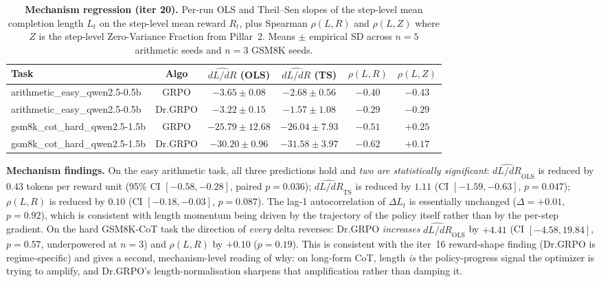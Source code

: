 \documentclass{article}
\begin{document}
\begin{table}[htbp]
\centering\small
\begin{tabular}{l c c c c c}
\hline
\textbf{Task} & \textbf{Algo} & \textbf{$\widehat{dL/dR}$ (OLS)} & \textbf{$\widehat{dL/dR}$ (TS)} & \textbf{$\rho(L,R)$} & \textbf{$\rho(L,Z)$} \\
\hline
arithmetic\_easy\_qwen2.5-0.5b & GRPO    & $-3.65 \pm 0.08$ & $-2.68 \pm 0.56$ & $-0.40$ & $-0.43$ \\
arithmetic\_easy\_qwen2.5-0.5b & Dr.GRPO & $-3.22 \pm 0.15$ & $-1.57 \pm 1.08$ & $-0.29$ & $-0.29$ \\
\hline
gsm8k\_cot\_hard\_qwen2.5-1.5b  & GRPO    & $-25.79 \pm 12.68$ & $-26.04 \pm 7.93$ & $-0.51$ & $+0.25$ \\
gsm8k\_cot\_hard\_qwen2.5-1.5b  & Dr.GRPO & $-30.20 \pm 0.96$  & $-31.58 \pm 3.97$ & $-0.62$ & $+0.17$ \\
\hline
\end{tabular}
\caption{\textbf{Mechanism regression (iter 20).} Per-run OLS and
Theil--Sen slopes of the step-level mean completion length $L_t$ on the
step-level mean reward $R_t$, plus Spearman $\rho(L, R)$ and $\rho(L, Z)$
where $Z$ is the step-level Zero-Variance Fraction from Pillar~2.
Means $\pm$ empirical SD across $n{=}5$ arithmetic seeds and $n{=}3$
GSM8K seeds.}
\label{tab:mechanism}
\end{table}

\textbf{Mechanism findings.} On the easy arithmetic task, all three
predictions hold and \emph{two are statistically significant}:
$\widehat{dL/dR}_{\text{OLS}}$ is reduced by $0.43$ tokens per reward
unit (95\% CI $[-0.58, -0.28]$, paired $p{=}0.036$);
$\widehat{dL/dR}_{\text{TS}}$ is reduced by $1.11$ (CI $[-1.59, -0.63]$,
$p{=}0.047$); $\rho(L,R)$ is reduced by $0.10$ (CI $[-0.18, -0.03]$,
$p{=}0.087$). The lag-1 autocorrelation of $\Delta L_t$ is essentially
unchanged ($\Delta = +0.01$, $p{=}0.92$), which is consistent with
length momentum being driven by the trajectory of the policy itself
rather than by the per-step gradient. On the hard GSM8K-CoT task the
direction of \emph{every} delta reverses: Dr.GRPO \emph{increases}
$\widehat{dL/dR}_{\text{OLS}}$ by $+4.41$ (CI $[-4.58, 19.84]$,
$p{=}0.57$, underpowered at $n{=}3$) and $\rho(L,R)$ by $+0.10$
($p{=}0.19$). This is consistent with the iter~16 reward-shape finding
(Dr.GRPO is regime-specific) and gives a second, mechanism-level reading
of why: on long-form CoT, length \emph{is} the policy-progress signal
the optimizer is trying to amplify, and Dr.GRPO's length-normalisation
sharpens that amplification rather than damping it.
\end{document}
